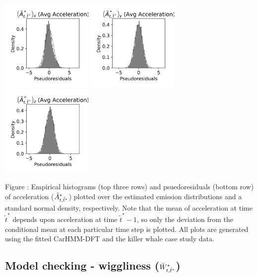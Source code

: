 \documentclass{article}
\begin{document}
\begin{center}
        \includegraphics[width=1.75in]{../Plots/CarHMM_psedoresids_Ax.png}
        \includegraphics[width=1.75in]{../Plots/CarHMM_psedoresids_Ay.png}
        \includegraphics[width=1.75in]{../Plots/CarHMM_psedoresids_Az.png}
        \end{center}
        
        \noindent Figure : Empirical histograms (top three rows) and psuedoresiduals (bottom row) of acceleration ($\tilde{A}^*_{t,\tilde t^*}$) plotted over the estimated emission distributions and a standard normal density, respectively. Note that the mean of acceleration at time $\tilde t^*$ depends upon acceleration at time $\tilde t^*-1$, so only the deviation from the conditional mean at each particular time step is plotted. All plots are generated using the fitted CarHMM-DFT and the killer whale case study data.
        \addtocounter{fignum}{1}
        
    \subsection{Model checking - wiggliness ($\tilde{W}^*_{t,\tilde t^*}$)}
        
\end{document}
